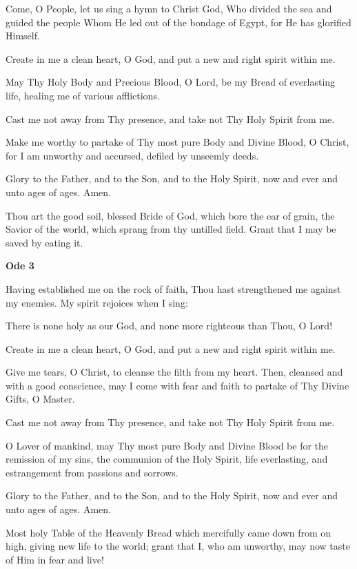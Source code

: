 \begin{hang}
\noindent{}Come, O People, let us sing a hymn to Christ God, Who divided the sea and guided the people Whom He led out of the bondage of Egypt, for He has glorified Himself.

Create in me a clean heart, O God, and put a new and right spirit within me.

May Thy Holy Body and Precious Blood, O Lord, be my Bread of everlasting life, healing me of various afflictions.

Cast me not away from Thy presence, and take not Thy Holy Spirit from me. 

Make me worthy to partake of Thy most pure Body and Divine Blood, O Christ, for I am unworthy and accursed, defiled by unseemly deeds.

Glory to the Father, and to the Son, and to the Holy Spirit, now and ever and unto ages of ages. Amen.

Thou art the good soil, blessed Bride of God, which bore the ear of grain, the Savior of the world, which sprang from thy untilled field. Grant that I may be saved by eating it.

\end{hang}

\begin{center}
\textbf{Ode 3}
\end{center}

\begin{hang}
\noindent{}Having established me on the rock of faith, Thou hast strengthened me against my enemies. My spirit rejoices when I sing:

There is none holy as our God, and none more righteous than Thou, O Lord!

Create in me a clean heart, O God, and put a new and right spirit within me.

Give me tears, O Christ, to cleanse the filth from my heart. Then, cleansed and with a good conscience, may I come with fear and faith to partake of Thy Divine Gifts, O Master.

Cast me not away from Thy presence, and take not Thy Holy Spirit from me.

O Lover of mankind, may Thy most pure Body and Divine Blood be for the remission of my sins, the communion of the Holy Spirit, life everlasting, and estrangement from passions and sorrows.

Glory to the Father, and to the Son, and to the Holy Spirit, now and ever and unto ages of ages. Amen.

Most holy Table of the Heavenly Bread which mercifully came down from on high, giving new life to the world; grant that I, who am unworthy, may now taste of Him in fear and live! 

\end{hang}

